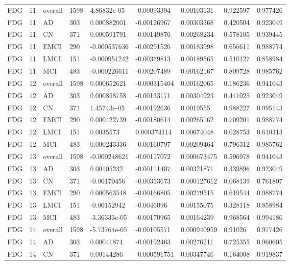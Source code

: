\begin{landscape}
\begin{longtable}{lllllllll}
FDG & 11 & overall & 1598 & 4.86832e-05 & -0.00093394 & 0.00103131 & 0.922597 & 0.977426 \\
FDG & 11 & AD & 303 & 0.000882001 & -0.00126967 & 0.00303368 & 0.420504 & 0.923049 \\
FDG & 11 & CN & 371 & 0.000591791 & -0.00149876 & 0.00268234 & 0.578105 & 0.939445 \\
FDG & 11 & EMCI & 290 & -0.000537636 & -0.00291526 & 0.00183998 & 0.656611 & 0.988774 \\
FDG & 11 & LMCI & 151 & -0.000951242 & -0.00379813 & 0.00189565 & 0.510127 & 0.858984 \\
FDG & 11 & MCI & 483 & -0.000226611 & -0.00207489 & 0.00162167 & 0.809728 & 0.985762 \\
FDG & 12 & overall & 1598 & 0.000652621 & -0.000315404 & 0.00162065 & 0.186236 & 0.941043 \\
FDG & 12 & AD & 303 & 0.000858758 & -0.00133171 & 0.00304923 & 0.441025 & 0.923049 \\
FDG & 12 & CN & 371 & 1.45743e-05 & -0.00192636 & 0.0019555 & 0.988227 & 0.995143 \\
FDG & 12 & EMCI & 290 & 0.000422739 & -0.00180614 & 0.00265162 & 0.709201 & 0.988774 \\
FDG & 12 & LMCI & 151 & 0.0035573 & 0.000374114 & 0.00674048 & 0.028753 & 0.610313 \\
FDG & 12 & MCI & 483 & 0.000243336 & -0.00160797 & 0.00209464 & 0.796312 & 0.985762 \\
FDG & 13 & overall & 1598 & -0.000248621 & -0.00117072 & 0.000673475 & 0.596978 & 0.941043 \\
FDG & 13 & AD & 303 & 0.00105232 & -0.00111407 & 0.00321871 & 0.339896 & 0.923049 \\
FDG & 13 & CN & 371 & -0.00170456 & -0.00353673 & 0.000127612 & 0.068139 & 0.761807 \\
FDG & 13 & EMCI & 290 & 0.000563548 & -0.00166805 & 0.00279515 & 0.619544 & 0.988774 \\
FDG & 13 & LMCI & 151 & -0.00152942 & -0.0046096 & 0.00155075 & 0.328118 & 0.858984 \\
FDG & 13 & MCI & 483 & -3.36333e-05 & -0.00170965 & 0.00164239 & 0.968564 & 0.994186 \\
FDG & 14 & overall & 1598 & -5.73764e-05 & -0.00105571 & 0.000940959 & 0.91026 & 0.977426 \\
FDG & 14 & AD & 303 & 0.00041874 & -0.00192463 & 0.00276211 & 0.725355 & 0.960605 \\
FDG & 14 & CN & 371 & 0.00144286 & -0.000591751 & 0.00347746 & 0.164008 & 0.919837 \\

\end{longtable}
\end{landscape}
